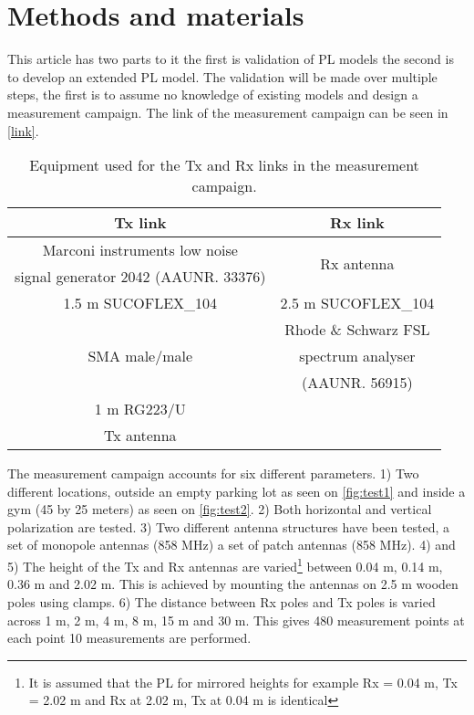 
\section{Methods and materials}


This article has two parts to it the first is validation of PL models the second is to develop an extended PL model. The validation will be made over multiple steps, the first is to assume no knowledge of existing models and design a measurement campaign. The link of the measurement campaign can be seen in \autoref{link}. 

\begin{table}[!htbp]
\centering
\begin{tabular}{|c|c|}\hline
\textbf{Tx link}&\textbf{Rx link}\\\hline
Marconi instruments low noise & \multirow{2}{*}{Rx antenna} \\
signal generator 2042 (AAUNR. 33376) \\\hline
1.5 m SUCOFLEX\_104 & 2.5 m SUCOFLEX\_104 \\\hline 
\multirow{3}{*}{SMA male/male} & Rhode \& Schwarz FSL \\
&spectrum analyser \\
& (AAUNR. 56915)\\\hline
1 m RG223/U & \\\hline
Tx antenna &\\\hline
\end{tabular}
\caption{Equipment used for the Tx and Rx links in the measurement campaign.}
\label{link}
\end{table}
The measurement campaign accounts for six different parameters. 1) Two different locations, outside an empty parking lot as seen on \autoref{fig:test1} and inside a gym (45 by 25 meters) as seen on \autoref{fig:test2}. 2) Both horizontal and vertical polarization are tested. 3) Two different antenna structures have been tested, a set of monopole antennas (858 MHz) a set of patch antennas (858 MHz). 4) and 5) The height of the Tx and Rx antennas are varied\footnote{It is assumed that the PL for mirrored heights for example Rx = 0.04 m, Tx = 2.02 m and Rx at 2.02 m, Tx at 0.04 m is identical} between 0.04 m, 0.14 m, 0.36 m and 2.02 m. This is achieved by mounting the antennas on 2.5 m wooden poles using clamps. 6) The distance between Rx poles and Tx poles is varied across 1 m, 2 m, 4 m, 8 m, 15 m and 30 m. This gives 480 measurement points at each point 10 measurements are performed.

